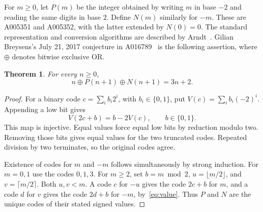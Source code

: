 \documentclass[11pt]{article}
\newtheorem{theorem}{Theorem}[section]
\begin{document}
For $m\ge0$, let $P(m)$ be the integer obtained by writing $m$ in base
$-2$ and reading the same digits in base $2$. Define $N(m)$ similarly
for $-m$. These are A005351 and A005352, with the latter extended by
$N(0)=0$. The standard representation and conversion algorithms are
described by Arndt~\cite{Arndt}. Gilian Breysens's July 21, 2017
conjecture in A016789~\cite{A016789} is the following assertion, where
$\oplus$ denotes bitwise exclusive OR.

\begin{theorem}\label{thm:xor}
For every $n\ge0$,
\[
 n\oplus P(n+1)\oplus N(n+1)=3n+2.
\]
\end{theorem}

\begin{proof}
For a binary code $c=\sum_i b_i2^i$, with $b_i\in\{0,1\}$, put
$V(c)=\sum_i b_i(-2)^i$. Appending a low bit gives
\begin{equation}\label{eq:value}
 V(2c+b)=b-2V(c),\qquad b\in\{0,1\}.
\end{equation}
This map is injective. Equal values force equal low bits by reduction
modulo two. Removing those bits gives equal values for the two truncated
codes. Repeated division by two terminates, so the original codes agree.

Existence of codes for $m$ and $-m$ follows simultaneously by strong
induction. For $m=0,1$ use the codes $0,1,3$. For $m\ge2$, set
$b=m\bmod2$, $u=\lfloor m/2\rfloor$, and $v=\lceil m/2\rceil$.
Both $u,v<m$. A code $c$ for $-u$ gives the code $2c+b$ for $m$, and
a code $d$ for $v$ gives the code $2d+b$ for $-m$, by~\eqref{eq:value}.
Thus $P$ and $N$ are the unique codes of their stated signed values.


\end{proof}
\end{document}
